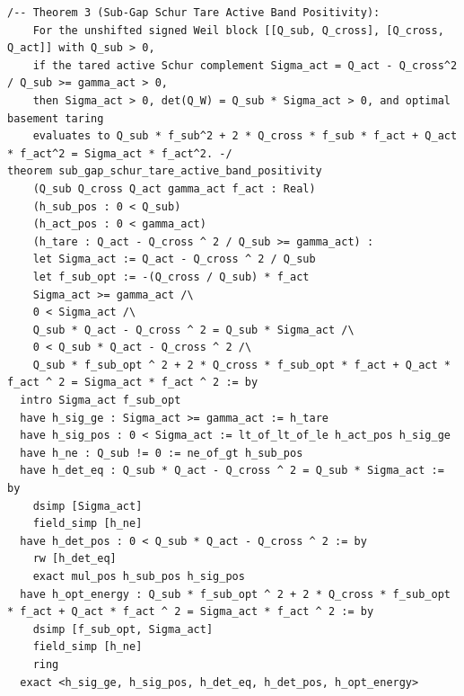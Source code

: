 \documentclass[11pt,a4paper]{article}
\begin{document}
\begin{lstlisting}[language=Lean4]
/-- Theorem 3 (Sub-Gap Schur Tare Active Band Positivity):
    For the unshifted signed Weil block [[Q_sub, Q_cross], [Q_cross, Q_act]] with Q_sub > 0,
    if the tared active Schur complement Sigma_act = Q_act - Q_cross^2 / Q_sub >= gamma_act > 0,
    then Sigma_act > 0, det(Q_W) = Q_sub * Sigma_act > 0, and optimal basement taring
    evaluates to Q_sub * f_sub^2 + 2 * Q_cross * f_sub * f_act + Q_act * f_act^2 = Sigma_act * f_act^2. -/
theorem sub_gap_schur_tare_active_band_positivity
    (Q_sub Q_cross Q_act gamma_act f_act : Real)
    (h_sub_pos : 0 < Q_sub)
    (h_act_pos : 0 < gamma_act)
    (h_tare : Q_act - Q_cross ^ 2 / Q_sub >= gamma_act) :
    let Sigma_act := Q_act - Q_cross ^ 2 / Q_sub
    let f_sub_opt := -(Q_cross / Q_sub) * f_act
    Sigma_act >= gamma_act /\
    0 < Sigma_act /\
    Q_sub * Q_act - Q_cross ^ 2 = Q_sub * Sigma_act /\
    0 < Q_sub * Q_act - Q_cross ^ 2 /\
    Q_sub * f_sub_opt ^ 2 + 2 * Q_cross * f_sub_opt * f_act + Q_act * f_act ^ 2 = Sigma_act * f_act ^ 2 := by
  intro Sigma_act f_sub_opt
  have h_sig_ge : Sigma_act >= gamma_act := h_tare
  have h_sig_pos : 0 < Sigma_act := lt_of_lt_of_le h_act_pos h_sig_ge
  have h_ne : Q_sub != 0 := ne_of_gt h_sub_pos
  have h_det_eq : Q_sub * Q_act - Q_cross ^ 2 = Q_sub * Sigma_act := by
    dsimp [Sigma_act]
    field_simp [h_ne]
  have h_det_pos : 0 < Q_sub * Q_act - Q_cross ^ 2 := by
    rw [h_det_eq]
    exact mul_pos h_sub_pos h_sig_pos
  have h_opt_energy : Q_sub * f_sub_opt ^ 2 + 2 * Q_cross * f_sub_opt * f_act + Q_act * f_act ^ 2 = Sigma_act * f_act ^ 2 := by
    dsimp [f_sub_opt, Sigma_act]
    field_simp [h_ne]
    ring
  exact <h_sig_ge, h_sig_pos, h_det_eq, h_det_pos, h_opt_energy>


\end{lstlisting}
\end{document}
